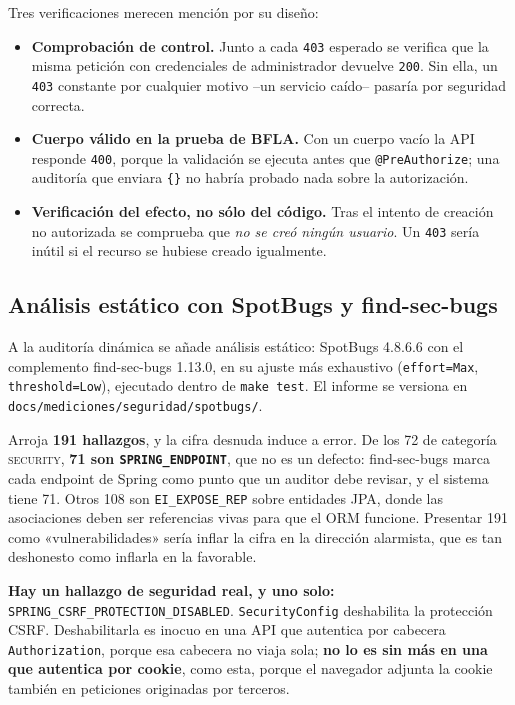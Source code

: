 \documentclass[11pt,a4paper]{article}
\begin{document}
Tres verificaciones merecen mención por su diseño:

\begin{itemize}[leftmargin=*]
  \item \textbf{Comprobación de control.} Junto a cada \texttt{403} esperado se
        verifica que la misma petición con credenciales de administrador devuelve
        \texttt{200}. Sin ella, un \texttt{403} constante por cualquier motivo
        --un servicio caído-- pasaría por seguridad correcta.
  \item \textbf{Cuerpo válido en la prueba de BFLA.} Con un cuerpo vacío la API
        responde \texttt{400}, porque la validación se ejecuta antes que
        \texttt{@PreAuthorize}; una auditoría que enviara \texttt{\{\}} no habría
        probado nada sobre la autorización.
  \item \textbf{Verificación del efecto, no sólo del código.} Tras el intento de
        creación no autorizada se comprueba que \emph{no se creó ningún usuario}.
        Un \texttt{403} sería inútil si el recurso se hubiese creado igualmente.
\end{itemize}

\subsection{Análisis estático con SpotBugs y find-sec-bugs}

A la auditoría dinámica se añade análisis estático: SpotBugs 4.8.6.6 con el
complemento find-sec-bugs 1.13.0, en su ajuste más exhaustivo
(\texttt{effort=Max}, \texttt{threshold=Low}), ejecutado dentro de \texttt{make
test}. El informe se versiona en
\texttt{docs\-/mediciones\-/seguridad\-/spotbugs\-/}.

Arroja \textbf{191 hallazgos}, y la cifra desnuda induce a error. De los 72 de
categoría \textsc{security}, \textbf{71 son \texttt{SPRING\_ENDPOINT}}, que no
es un defecto: find-sec-bugs marca cada endpoint de Spring como punto que un
auditor debe revisar, y el sistema tiene 71. Otros 108 son
\texttt{EI\_EXPOSE\_REP} sobre entidades JPA, donde las asociaciones deben ser
referencias vivas para que el ORM funcione. Presentar 191 como
«vulnerabilidades» sería inflar la cifra en la dirección alarmista, que es tan
deshonesto como inflarla en la favorable.

\textbf{Hay un hallazgo de seguridad real, y uno solo:}
\texttt{SPRING\_CSRF\_PROTECTION\_DISABLED}. \texttt{SecurityConfig} deshabilita
la protección CSRF. Deshabilitarla es inocuo en una API que autentica por
cabecera \texttt{Authorization}, porque esa cabecera no viaja sola; \textbf{no
lo es sin más en una que autentica por cookie}, como esta, porque el navegador
adjunta la cookie también en peticiones originadas por terceros.
\end{document}
